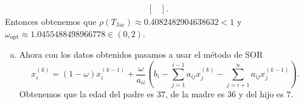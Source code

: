 \begin{frame}
\begin{solution}
\begin{enumerate}[b)]
\begin{align*}
\begin{bmatrix}
				      \end{bmatrix}.
			      \end{align*}
			      Entonces obtenemos que
			      \begin{math}
				      \rho\left(T_{\text{Jac}}\right)\approx
				      0.4082482904638632<1
			      \end{math}
			      y
			      \begin{math}
				      \omega_{\text{opt}}\approx
				      1.0455488498966778\in\left(0,2\right)
			      \end{math}.
		\end{enumerate}
	\end{solution}
\end{frame}

\begin{frame}
	\begin{solution}
		\begin{enumerate}[b)]
			\item

			      Ahora con los datos obtenidos pasamos a usar el método de
			      SOR
			      \begin{equation*}
				      x_{i}^{\left(k\right)}=
				      \left(1-\omega\right)
				      x_{i}^{\left(k-1\right)}+
				      \dfrac{\omega}{a_{ii}}
				      \left(
				      b_{i}-
				      \sum\limits_{j=1}^{i-1}
				      a_{ij}x_{j}^{\left(k\right)}-
				      \sum\limits_{j=i+1}^{n}
				      a_{ij}x_{j}^{\left(k-1\right)}
				      \right).
			      \end{equation*}
			      Obtenemos que la edad del \alert{padre es $37$}, de la
			      \alert{madre es $36$} y del \alert{hijo es $7$}.
		\end{enumerate}
	\end{solution}
\end{frame}

\begin{frame}[fragile]
	\begin{columns}
		\begin{column}{0.48\textwidth}
			\inputminted[fontsize=\tiny,firstline=1,lastline=24]{python}{p4_sor.py}
		\end{column}
		\begin{column}{0.48\textwidth}
			\inputminted[fontsize=\tiny,firstline=26,lastline=52]{python}{p4_sor.py}
		\end{column}
	\end{columns}
\end{frame}

